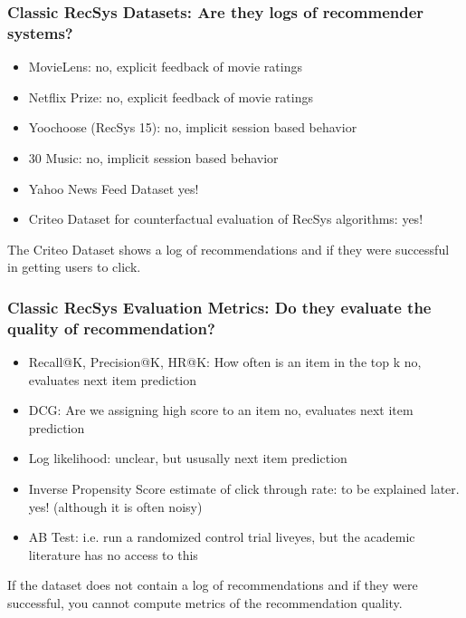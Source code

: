  \begin{frame}
  \frametitle{Classic RecSys Datasets: Are they logs of recommender systems?}

  \begin{itemize}
    \item MovieLens: \pause no, explicit feedback of movie ratings \pause
    \item Netflix Prize: \pause no, explicit feedback of movie ratings \pause
    \item Yoochoose (RecSys 15): \pause no, implicit session based behavior \pause
    \item 30 Music: \pause no, implicit session based behavior \pause
    \item Yahoo News Feed Dataset \pause yes!
    \item Criteo Dataset for counterfactual evaluation of RecSys algorithms: \pause yes!
  \end{itemize}

  \pause
  The Criteo Dataset shows a log of recommendations and if they were successful in getting users to click.  
\end{frame}



\begin{frame}
  \frametitle{Classic RecSys Evaluation Metrics: Do they evaluate the quality of recommendation?}

  \begin{itemize}
    \item Recall@K, Precision@K, HR@K:  \pause How often is an item in the top k \pause no, evaluates next item prediction \pause
    \item DCG:   \pause Are we assigning high score to an item \pause no, evaluates next item prediction \pause
    \item Log likelihood: \pause  unclear, but ususally next item prediction \pause
    \item Inverse Propensity Score estimate of click through rate: \pause to be explained later. \pause yes! (although it is often noisy) \pause
    \item AB Test: \pause i.e. run a randomized control trial live\pause yes, but the academic literature has no access to this 
  \end{itemize}

  \pause
If the dataset does not contain a log of recommendations and if they were successful, you cannot compute metrics of the recommendation quality.
\end{frame}


